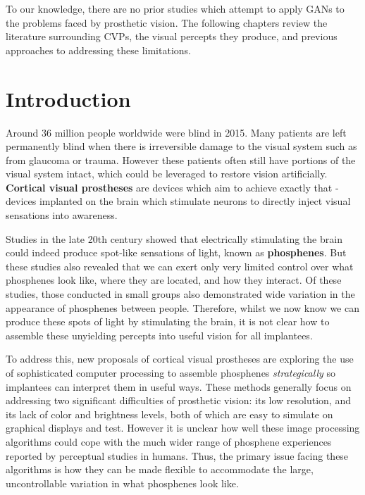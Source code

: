 \documentclass[a4paper,11pt,openany]{book}
\begin{document}
To our knowledge, there are no prior studies which attempt to apply GANs to the problems faced by prosthetic vision.
The following chapters review the literature surrounding CVPs, the visual percepts they produce, and previous approaches to addressing these limitations.

\chapter{Introduction}
\label{sec:orge2aef8c}

Around 36 million people worldwide were blind in 2015. \cite{bourne_magnitude_2017,flaxman_global_2017}
Many patients are left permanently blind when there is irreversible damage to the visual system such as from glaucoma or trauma. \cite{lee_glaucoma_2005,zachariades_blindness_1996}
However these patients often still have portions of the visual system intact, which could be leveraged to restore vision artificially.
\textbf{Cortical visual prostheses} are devices which aim to achieve exactly that - devices implanted on the brain which stimulate neurons to directly inject visual sensations into awareness. \cite{normann_toward_2009,lewis_restoration_2015,foroushani_cortical_2018}

Studies in the late 20th century showed that electrically stimulating the brain could indeed produce spot-like sensations of light, known as \textbf{phosphenes}. \cite{brindley_sensations_1968,dobelle_phosphenes_1974,bak_visual_1990,bosking_electrical_2017}
But these studies also revealed that we can exert only very limited control over what phosphenes look like, where they are located, and how they interact. \cite{rushton_properties_1978,dobelle_phosphenes_1974,schmidt_feasibility_1996}
Of these studies, those conducted in small groups also demonstrated wide variation in the appearance of phosphenes between people. \cite{dobelle_phosphenes_1974,bak_visual_1990}
Therefore, whilst we now know we can produce these spots of light by stimulating the brain, it is not clear how to assemble these unyielding percepts into useful vision for all implantees. \cite{fernandez_development_2005,beyeler_learning_2017}

To address this, new proposals of cortical visual prostheses are exploring the use of sophisticated computer processing to assemble phosphenes \emph{strategically} so implantees can interpret them in useful ways. \cite{foroushani_cortical_2018,barnes_role_2012}
These methods generally focus on addressing two significant difficulties of prosthetic vision: its low resolution, and its lack of color and brightness levels, both of which are easy to simulate on graphical displays and test.  \cite{buffoni_image_2005,chang_facial_2012,sharmili_comparative_2017}
However it is unclear how well these image processing algorithms could cope with the much wider range of phosphene experiences reported by perceptual studies in humans.
Thus, the primary issue facing these algorithms is how they can be made flexible to accommodate the large, uncontrollable variation in what phosphenes look like.
\end{document}
